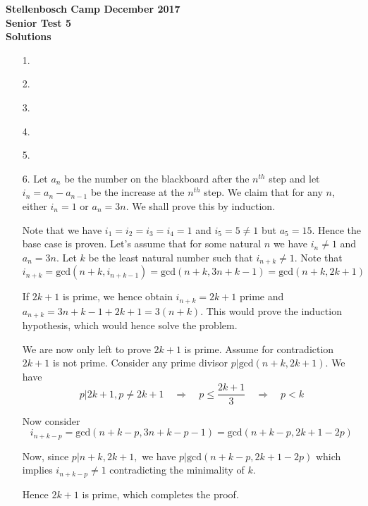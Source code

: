 \documentclass[a4paper, 12pt]{article}
\begin{document}
\begin{center}
\textbf{Stellenbosch Camp December 2017 \\ Senior Test 5} \\
\textbf{Solutions}
\end{center}


\begin{enumerate}

    \item[1.] 
    
    
    \item[2.] 
    
    
    \item[3.] 
    

    \item[4.] 
    
    
    \item[5.] 
    
    
    \item[6.] Let $a_n$ be the number on the blackboard after the $n^{th}$ step and let $i_n = a_n - a_{n-1}$ be the increase at the $n^{th}$ step. We claim that for any $n$, either $i_n = 1$ or $a_n = 3n$. We shall prove this by induction.
    
    Note that we have $i_1=i_2=i_3=i_4=1$ and $i_5=5\neq 1$ but $a_5=15$. Hence the base case is proven. Let's assume that for some natural $n$ we have $i_n\neq 1$ and $a_n=3n$. Let $k$ be the least natural number such that $i_{n+k}\neq 1$. Note that
    $$ i_{n+k}=\textrm{gcd}(n+k, i_{n+k-1})=\textrm{gcd}(n+k, 3n+k-1)=\textrm{gcd}(n+k, 2k+1) $$
    
    If $2k+1$ is prime, we hence obtain $i_{n+k}=2k+1$ prime and $a_{n+k}=3n+k-1+2k+1=3(n+k)$. This would prove the induction hypothesis, which would hence solve the problem.
    
    We are now only left to prove $2k+1$ is prime. Assume for contradiction $2k+1$ is not prime. Consider any prime divisor $p|\textrm{gcd}(n+k, 2k+1)$. We have
     $$ p|2k+1, p\neq 2k+1 \quad \Longrightarrow \quad p \leq \frac{2k+1}{3} \quad \Longrightarrow \quad p<k $$
     
     Now consider
     $$ i_{n+k-p}=\textrm{gcd}(n+k-p, 3n+k-p-1)=\textrm{gcd}(n+k-p, 2k+1-2p) $$
     
     Now, since $p|n+k, 2k+1,$ we have $p|\textrm{gcd}(n+k-p, 2k+1-2p)$ which implies $ i_{n+k-p} \neq 1$ contradicting the minimality of $k$.
     
     Hence $2k+1$ is prime, which completes the proof.
    
    
\end{enumerate}


\centering
\begin{BVerbatim}
\end{BVerbatim}
\end{document}
